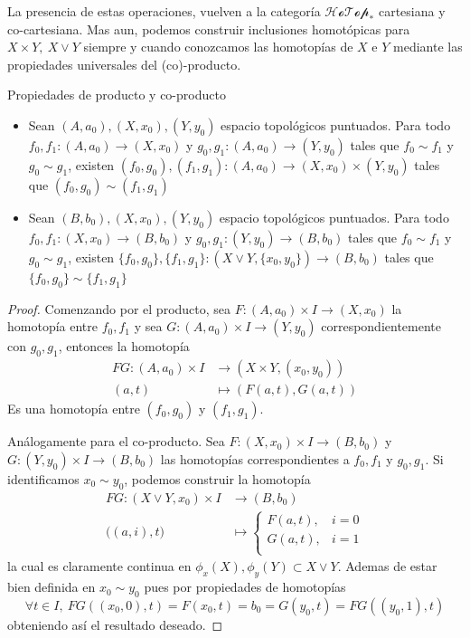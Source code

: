 La presencia de estas operaciones, vuelven a la categoría
\(\mathscr{HoTop}_*\) cartesiana y co-cartesiana. Mas aun, podemos
construir inclusiones homotópicas para \(X \times Y,\ X \vee Y\)
siempre y cuando conozcamos las homotopías de \(X\) e \(Y\) mediante
las propiedades universales del (co)-producto.

\begin{teorema} \label{thm:prop-prod}
  Propiedades de producto y co-producto
  \begin{itemize}
    \item Sean \((A,a_0), (X,x_0), (Y,y_0)\) espacio topológicos
      puntuados. Para todo \(f_0, f_1 : (A,a_0) \to (X,x_0)\) y \(g_0,
      g_1 : (A, a_0) \to (Y,y_0)\) tales que \(f_0 \sim f_1 \) y \(g_0
      \sim g_1 \), existen \( (f_0, g_0), (f_1, g_1) : (A,a_0) \to (X,x_0)
      \times (Y,y_0)\) tales que \((f_0 , g_0) \sim (f_1 , g_1) \)
    \item Sean \((B,b_0), (X,x_0), (Y,y_0)\) espacio topológicos
      puntuados. Para todo \(f_0, f_1 : (X,x_0) \to (B,b_0) \) y \(g_0,
      g_1 : (Y, y_0) \to (B,b_0)\) tales que \(f_0 \sim f_1 \) y \(g_0
      \sim g_1 \), existen \( \{f_0, g_0\}, \{f_1, g_1\} : (X \vee
      Y,\{x_0,y_0\}) \to (B,b_0) \) tales que \(\{f_0 , g_0\} \sim \{f_1 ,
      g_1\} \)
  \end{itemize}
\end{teorema}
\begin{proof}
Comenzando por el producto, sea \(F : (A,a_0) \times I \to (X,x_0)\) la homotopía
entre \(f_0 , f_1\) y sea \(G : (A,a_0) \times I \to (Y,y_0)\)
correspondientemente con \(g_0, g_1\), entonces la homotopía
\begin{align*}
  FG : (A,a_0) \times I &\to \left( X \times Y , (x_0, y_0) \right) \\
       (a, t) &\mapsto (F(a,t) , G(a,t))
\end{align*}
Es una homotopía entre \((f_0 , g_0)\) y \((f_1 , g_1)\).

Análogamente para el co-producto. Sea \(F : (X,x_0) \times I \to
(B,b_0)\) y \(G : (Y,y_0) \times I \to (B,b_0)\) las homotopías
correspondientes a \(f_0 , f_1\) y \(g_0
, g_1\). Si identificamos \(x_0 \sim y_0\), podemos construir la homotopía
\begin{align*}
  FG : \left( X \vee Y , x_0 \right) \times I &\to (B, b_0) \\
  \big((a,i) , t \big) &\mapsto
                \begin{cases}
                  F(a,t), & i = 0 \\
                  G(a,t), & i = 1 \\
                \end{cases}
\end{align*}
la cual es claramente continua en \(\phi_x(X), \phi_y(Y) \subset X \vee
Y\). Ademas de estar bien definida en \(x_0 \sim y_0\) pues por
propiedades de homotopías
\[
  \forall t \in I,\ FG \left( (x_0,0) , t \right) = F (x_0, t) = b_0 =
  G(y_0, t) = FG \left( (y_0,1), t \right)
\]
obteniendo así el resultado deseado.
\end{proof}

